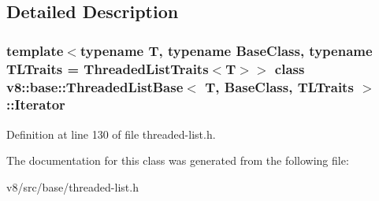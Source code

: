 \subsection{Detailed Description}
\subsubsection*{template$<$typename T, typename Base\+Class, typename T\+L\+Traits = Threaded\+List\+Traits$<$\+T$>$$>$\newline
class v8\+::base\+::\+Threaded\+List\+Base$<$ T, Base\+Class, T\+L\+Traits $>$\+::\+Iterator}



Definition at line 130 of file threaded-\/list.\+h.



The documentation for this class was generated from the following file\+:\begin{DoxyCompactItemize}
\item 
v8/src/base/threaded-\/list.\+h\end{DoxyCompactItemize}
